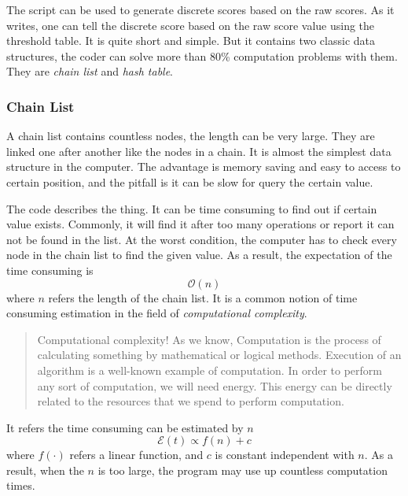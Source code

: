 The script can be used to generate discrete scores based on the raw scores.
As it writes, one can tell the discrete score based on the raw score value using the threshold table.
It is quite short and simple.
But it contains two classic data structures, the coder can solve more than 80\% computation problems with them.
They are \emph{chain list} and \emph{hash table}.

\subsubsection{Chain List}

A chain list contains countless nodes,
the length can be very large.
They are linked one after another like the nodes in a chain.
It is almost the simplest data structure in the computer.
The advantage is memory saving and easy to access to certain position,
and the pitfall is it can be slow for query the certain value.



The code describes the thing.
It can be time consuming to find out if certain value exists.
Commonly, it will find it after too many operations or report it can not be found in the list.
At the worst condition, the computer has to check every node in the chain list to find the given value.
As a result, the expectation of the time consuming is
\begin{equation}
    \label{Eq: cc-o1}
    \mathcal{O}(n)
\end{equation}
where $n$ refers the length of the chain list.
It is a common notion of time consuming estimation in the field of \emph{computational complexity}.

\begin{quote}
    Computational complexity!
    As we know, Computation is the process of calculating something by mathematical or logical methods.
    Execution of an algorithm is a well-known example of computation.
    In order to perform any sort of computation, we will need energy.
    This energy can be directly related to the resources that we spend to perform computation.

\end{quote}

It refers the time consuming can be estimated by $n$
\begin{equation*}
    \mathcal{E}(t) \propto f(n) + c
\end{equation*}
where $f(\cdot)$ refers a linear function, and $c$ is constant independent with $n$.
As a result, when the $n$ is too large, the program may use up countless computation times.

